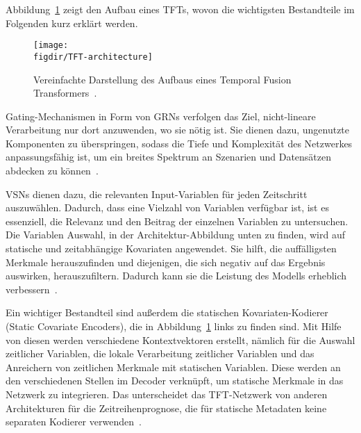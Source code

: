 Abbildung~\ref{FIG:tft-architecture} zeigt den Aufbau eines \acp{TFT}, wovon die wichtigsten Bestandteile im Folgenden kurz erklärt werden.
\begin{figure}
 \caption[Aufbau eines Temporal Fusion Transformers]{Vereinfachte Darstellung des Aufbaus eines Temporal Fusion Transformers~\cite{Labiadh.2023}.}
 {\texttt{[image: \\figdir/TFT-architecture]}}
 \label{FIG:tft-architecture}
\end{figure}

Gating-Mechanismen in Form von \acp{GRN} verfolgen das Ziel, nicht-lineare Verarbeitung nur dort anzuwenden, wo sie nötig ist.
Sie dienen dazu, ungenutzte Komponenten zu überspringen, sodass die Tiefe und Komplexität des Netzwerkes anpassungsfähig ist, um ein breites Spektrum an Szenarien und Datensätzen abdecken zu können~\cite{Lim.19.12.2019}.

\acp{VSN} dienen dazu, die relevanten Input-Variablen für jeden Zeitschritt auszuwählen.
Dadurch, dass eine Vielzahl von Variablen verfügbar ist, ist es essenziell, die Relevanz und den Beitrag der einzelnen Variablen zu untersuchen.
Die Variablen Auswahl, in der Architektur-Abbildung unten zu finden, wird auf statische und zeitabhängige Kovariaten angewendet.
Sie hilft, die auffälligsten Merkmale herauszufinden und diejenigen, die sich negativ auf das Ergebnis auswirken, herauszufiltern.
Dadurch kann sie die Leistung des Modells erheblich verbessern~\cite{Lim.19.12.2019}.

Ein wichtiger Bestandteil sind außerdem die statischen Kovariaten-Kodierer (Static Covariate Encoders), die in Abbildung~\ref{FIG:tft-architecture} links zu finden sind.
Mit Hilfe von diesen werden verschiedene Kontextvektoren erstellt, nämlich für die Auswahl zeitlicher Variablen, die lokale Verarbeitung zeitlicher Variablen und das Anreichern von zeitlichen Merkmale mit statischen Variablen.
Diese werden an den verschiedenen Stellen im Decoder verknüpft, um statische Merkmale in das Netzwerk zu integrieren.
Das unterscheidet das \ac{TFT}-Netzwerk von anderen Architekturen für die Zeitreihenprognose, die für statische Metadaten keine separaten Kodierer verwenden~\cite{Lim.19.12.2019, Labiadh.2023}.

